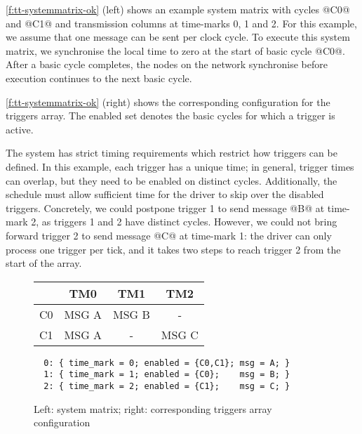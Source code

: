 \autoref{f:tt-systemmatrix-ok} (left) shows an example system matrix with cycles @C0@ and @C1@ and transmission columns at time-marks 0, 1 and 2.
For this example, we assume that one message can be sent per clock cycle. %
To execute this system matrix, we synchronise the local time to zero at the start of basic cycle @C0@.
After a basic cycle completes, the nodes on the network synchronise before execution continues to the next basic cycle.

\autoref{f:tt-systemmatrix-ok} (right) shows the corresponding configuration for the triggers array.
The enabled set denotes the basic cycles for which a trigger is active.

The system has strict timing requirements which restrict how triggers can be defined.
In this example, each trigger has a unique time; in general, trigger times can overlap, but they need to be enabled on distinct cycles.
Additionally, the schedule must allow sufficient time for the driver to skip over the disabled triggers.
Concretely, we could postpone trigger 1 to send message @B@ at time-mark 2, as triggers 1 and 2 have distinct cycles.
However, we could not bring forward trigger 2 to send message @C@ at time-mark 1: the driver can only process one trigger per tick, and it takes two steps to reach trigger 2 from the start of the array.

\begin{figure}
  \begin{minipage}{0.38\textwidth}
\begin{tabular}{r|ccc}
   & TM0 & TM1 & TM2 \\
  \hline
  C0 & MSG A & MSG B & - \\
  C1 & MSG A & - & MSG C
\end{tabular}
\end{minipage}
\begin{minipage}{0.6\textwidth}
\small
\begin{verbatim}
  0: { time_mark = 0; enabled = {C0,C1}; msg = A; }
  1: { time_mark = 1; enabled = {C0};    msg = B; }
  2: { time_mark = 2; enabled = {C1};    msg = C; }
\end{verbatim}
\end{minipage}
  
\caption{Left: system matrix; right: corresponding triggers array configuration}
\label{f:tt-systemmatrix-ok}
\end{figure}

